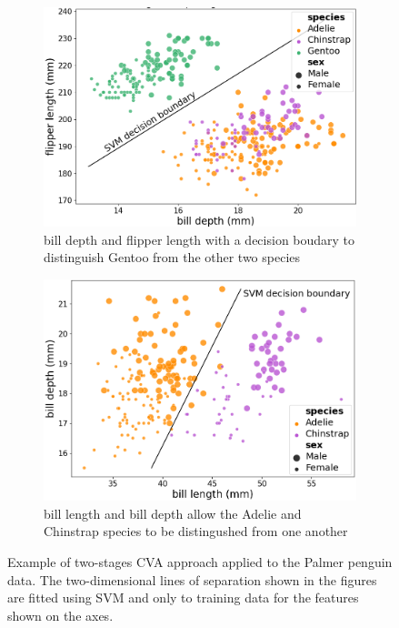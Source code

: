 \documentclass[12pt]{article}
\begin{document}
\begin{figure}[!ht]
  \begin{subfigure}{0.5\textwidth}
    \centering
    \includegraphics[width=1.05\textwidth]{sup_fliplen_billdepth.png} %
    \caption{bill depth and flipper length with a decision boudary to distinguish Gentoo from the other two species}
    \label{fig:CVA_part_a}
  \end{subfigure}
  \hfill
  \begin{subfigure}{0.5\textwidth}
    \centering
    \includegraphics[width=1.05\textwidth]{sup_billlen_billdepth.png} %
    \caption{bill length and bill depth allow the Adelie and Chinstrap species to be distingushed from one another}
    \label{fig:CVA_part_b}
  \end{subfigure}
  \caption{Example of two-stages CVA approach applied to the Palmer penguin data. 
  The two-dimensional lines of separation shown in the figures are fitted using SVM 
  and only to training data for the features shown on the axes.}
  \label{fig:CVA}
\end{figure}
\end{document}
